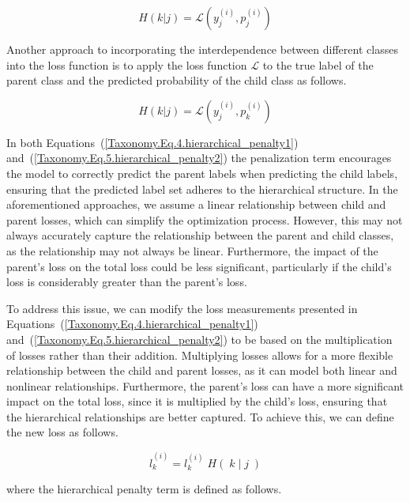\documentclass[preprint,3p,times, review]{elsarticle}
\begin{document}
\begin{equation}
    H(k \vert j)=\mathcal{L} \left(y_j^{(i)},p_j^{(i)}\right)
    \label{Taxonomy.Eq.4.hierarchical_penalty1}
\end{equation}

Another approach to incorporating the interdependence between different classes into the loss function is to apply the loss function $\mathcal{L} $ to the true label of the parent class and the predicted probability of the child class as follows.

\begin{equation}
    H\left(k\vert j\right) = \mathcal{L} \left(y_j^{(i)},p_k^{(i)}\right)
    \label{Taxonomy.Eq.5.hierarchical_penalty2}
\end{equation}

In both Equations~(\ref{Taxonomy.Eq.4.hierarchical_penalty1}) and~(\ref{Taxonomy.Eq.5.hierarchical_penalty2}) the penalization term encourages the model to correctly predict the parent labels when predicting the child labels, ensuring that the predicted label set adheres to the hierarchical structure. In the aforementioned approaches, we assume a linear relationship between child and parent losses, which can simplify the optimization process. However, this may not always accurately capture the relationship between the parent and child classes, as the relationship may not always be linear. Furthermore, the impact of the parent's loss on the total loss could be less significant, particularly if the child's loss is considerably greater than the parent's loss.

To address this issue, we can modify the loss measurements presented in Equations~(\ref{Taxonomy.Eq.4.hierarchical_penalty1}) and~(\ref{Taxonomy.Eq.5.hierarchical_penalty2})  to be based on the multiplication of losses rather than their addition. Multiplying losses allows for a more flexible relationship between the child and parent losses, as it can model both linear and nonlinear relationships. Furthermore, the parent's loss can have a more significant impact on the total loss, since it is multiplied by the child's loss, ensuring that the hierarchical relationships are better captured. To achieve this, we can define the new loss as follows.

\begin{equation}
    \label{Taxonomy.Eq.newloss}
    \widehat{l}_k^{(i)}=l_k^{(i)}\;H\left(\;k\;\vert\;j\;\right)
\end{equation}

where the hierarchical penalty term is defined as follows.
\end{document}
